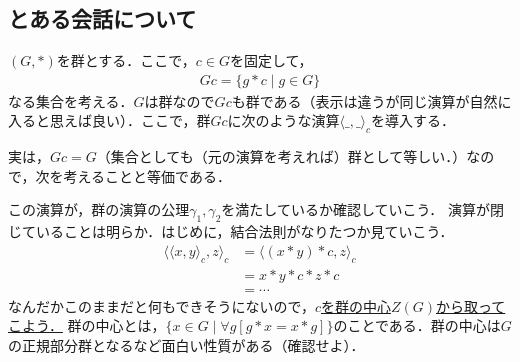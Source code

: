 \documentclass[dvipdfmx,12pt]{jsarticle}
\begin{document}
\subsection*{とある会話について}
$(G,*)$を群とする．ここで，$c \in G$を固定して，
\begin{align*}
Gc = \{g*c \mid g \in G\}
\end{align*}
なる集合を考える．$G$は群なので$Gc$も群である（表示は違うが同じ演算が自然に入ると思えば良い）．ここで，群$Gc$に次のような演算$\langle \_, \_ \rangle_c$を導入する．
%
\begin{center}
\end{center}
%
実は，$Gc = G$（集合としても（元の演算を考えれば）群として等しい．）なので，次を考えることと等価である．
%
\begin{center}
\end{center}
%
この演算が，群の演算の公理$\gamma_1, \gamma_2$を満たしているか確認していこう．
演算が閉じていることは明らか．はじめに，結合法則がなりたつか見ていこう．
\begin{align*}
\langle \langle x, y \rangle_c , z \rangle_c &= \langle (x*y)*c , z\rangle_c \\
&= x*y*c*z*c \\
&= \cdots
\end{align*}
なんだかこのままだと何もできそうにないので，\underline{$c$を群の中心$Z(G)$から取ってこよう．}
群の中心とは，$\{ x \in G \mid \forall g [g*x = x*g] \}$のことである．群の中心は$G$の正規部分群となるなど面白い性質がある（確認せよ）．
\end{document}
